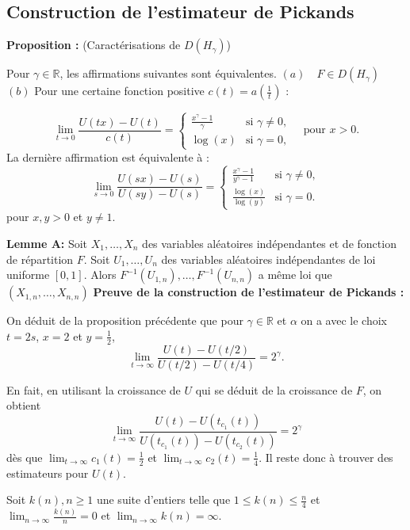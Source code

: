 \documentclass{article}
\theoremstyle{plain}
\theoremstyle{definition}
\theoremstyle{plain}
\begin{document}
\subsection{Construction de l'estimateur de Pickands}
\textbf{Proposition :} (Caractérisations de \( D(H_{\gamma}) \))

Pour \( \gamma \in \mathbb{R} \), les affirmations suivantes sont équivalentes. \newline
\( (a) \quad F \in D(H_{\gamma}) \) \newline
\( (b) \) Pour une certaine fonction positive \( c(t) = a\left( \frac{1}{t} \right) \) :

\[
\lim_{t \to 0} \frac{U(tx) - U(t)}{c(t)} = 
\begin{cases} 
\frac{x^\gamma - 1}{\gamma} & \text{si } \gamma \neq 0, \\
\log(x) & \text{si } \gamma = 0, 
\end{cases}
\quad \text{pour } x > 0.
\]
La dernière affirmation est équivalente à :
\[
\lim_{s \to 0} \frac{U(sx) - U(s)}{U(sy) - U(s)} = 
\begin{cases} 
\frac{x^\gamma - 1}{y^\gamma - 1} & \text{si } \gamma \neq 0, \\
\frac{\log(x)}{\log(y)} & \text{si } \gamma = 0.
\end{cases}
\]
pour \(x,y > 0\) et \(y \neq 1\). \newline

\textbf{Lemme A:}
Soit \(X_1, \dots, X_n\) des variables aléatoires indépendantes et de fonction de répartition \(F\).
Soit \(U_1, \dots, U_n\) des variables aléatoires indépendantes de loi uniforme \(\left[0,1\right]\). Alors \(F^{-1}(U_{1,n}), \dots, F^{-1}(U_{n,n})\) a même loi que \((X_{1,n}, \dots, X_{n,n})\)\newline
\textbf{Preuve de la construction de l'estimateur de Pickands :}

On déduit de la proposition précédente que pour $\gamma \in \mathbb{R}$ et $\alpha$ on a avec le choix $t = 2s$, $x = 2$ et $y = \frac{1}{2}$,
\[
\lim_{t \to \infty} \frac{U(t) - U(t/2)}{U(t/2) - U(t/4)} = 2^{\gamma}.
\]

En fait, en utilisant la croissance de $U$ qui se déduit de la croissance de $F$, on obtient
\[
\lim_{t \to \infty} \frac{U(t) - U(t_{c_1}(t))}{U(t_{c_1}(t)) - U(t_{c_2}(t))} = 2^{\gamma}
\]
dès que $\lim_{t \to \infty} c_1(t) = \frac{1}{2}$ et $\lim_{t \to \infty} c_2(t) = \frac{1}{4}$. Il reste donc à trouver des estimateurs pour $U(t)$.

Soit $k(n), n \geq 1$ une suite d’entiers telle que $1 \leq k(n) \leq \frac{n}{4}$ et $\lim_{n \to \infty} \frac{k(n)}{n} = 0$ et $\lim_{n \to \infty} k(n) = \infty$.
\end{document}
